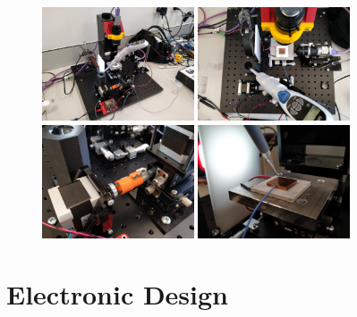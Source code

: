 \begin{figure}[h]
    \centering
    \includegraphics[width=0.4\textwidth]{img/full_sys.jpg}
    \includegraphics[width=0.4\textwidth]{img/impl_sys_top.jpg}
    \includegraphics[width=0.4\textwidth]{img/impl_coup.jpg}
    \includegraphics[width=0.4\textwidth]{img/new_stack.jpg}
\end{figure}

\section{Electronic Design}

